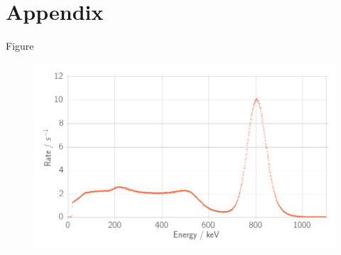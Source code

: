 \documentclass[xcolor=x11names,compress]{beamer}
\renewcommand{\(}{\begin{columns}}
\renewcommand{\)}{\end{columns}}
\newcommand{\<}[1]{\begin{column}{#1}}
\renewcommand{\>}{\end{column}}
\begin{document}
\section{Appendix}
\label{sec:appendix}
\begin{frame}[t]{Figure}
 \begin{figure}[htpb]
    \centering
    \includegraphics[width=1.0\linewidth]{../figures/na_total_incident}
    \label{fig:histo_na_137cs}
\end{figure}
\end{frame}
\end{document}
